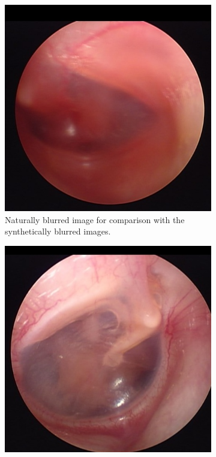 \begin{figure}[H]
    \centering
    \begin{subfigure}[t]{0.3\textwidth}
        \includegraphics[width=\textwidth]{Figures/BlurredImages/Gaussian/21.png}
        \caption{Naturally blurred image for comparison with the synthetically blurred images.}
        \label{fig:blur}
    \end{subfigure}\hspace{1em}
    \begin{subfigure}[t]{0.3\textwidth}
        \includegraphics[width=\textwidth]{Figures/BlurredImages/Gaussian/13.png}

\end{subfigure}
\end{figure}
